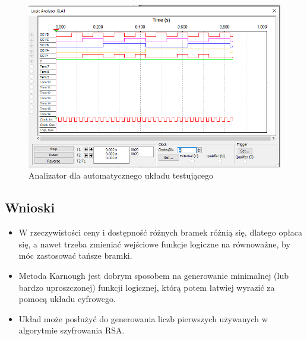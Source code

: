 \documentclass{article}
\begin{document}
\begin{figure}[H]
    \centering
    \includegraphics[width=\textwidth]{analiza_test_2.png}
    \caption{Analizator dla automatycznego układu testującego}
\end{figure}

\subsection{Wnioski}
\begin{itemize}
    \item
    W rzeczywistości ceny i dostępność różnych bramek różnią się, dlatego opłaca się, a nawet trzeba zmieniać 
    wejściowe funkcje logiczne na równoważne, by móc zastosować tańsze bramki.
    \item
    Metoda Karnough jest dobrym sposobem na generowanie minimalnej (lub bardzo uproszczonej) 
    funkcji logicznej, którą potem łatwiej wyrazić za pomocą układu cyfrowego.
    \item
    Układ może posłużyć do generowania liczb pierwszych używanych w algorytmie szyfrowania RSA.
\end{itemize}
\end{document}
